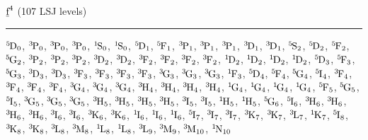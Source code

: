 \begin{mdframed}
\begin{center}
$\forb^{4}$
(107 LSJ levels)
\vspace{0.25cm}
\hrule
\vspace{0.25cm}

$\LSJterm{5}{D}{0}$, $\LSJterm{3}{P}{0}$, $\LSJterm{3}{P}{0}$, $\LSJterm{3}{P}{0}$, $\LSJterm{1}{S}{0}$, $\LSJterm{1}{S}{0}$, $\LSJterm{5}{D}{1}$, $\LSJterm{5}{F}{1}$, $\LSJterm{3}{P}{1}$, $\LSJterm{3}{P}{1}$, $\LSJterm{3}{P}{1}$, $\LSJterm{3}{D}{1}$, $\LSJterm{3}{D}{1}$, $\LSJterm{5}{S}{2}$, $\LSJterm{5}{D}{2}$, $\LSJterm{5}{F}{2}$, $\LSJterm{5}{G}{2}$, $\LSJterm{3}{P}{2}$, $\LSJterm{3}{P}{2}$, $\LSJterm{3}{P}{2}$, $\LSJterm{3}{D}{2}$, $\LSJterm{3}{D}{2}$, $\LSJterm{3}{F}{2}$, $\LSJterm{3}{F}{2}$, $\LSJterm{3}{F}{2}$, $\LSJterm{3}{F}{2}$, $\LSJterm{1}{D}{2}$, $\LSJterm{1}{D}{2}$, $\LSJterm{1}{D}{2}$, $\LSJterm{1}{D}{2}$, $\LSJterm{5}{D}{3}$, $\LSJterm{5}{F}{3}$, $\LSJterm{5}{G}{3}$, $\LSJterm{3}{D}{3}$, $\LSJterm{3}{D}{3}$, $\LSJterm{3}{F}{3}$, $\LSJterm{3}{F}{3}$, $\LSJterm{3}{F}{3}$, $\LSJterm{3}{F}{3}$, $\LSJterm{3}{G}{3}$, $\LSJterm{3}{G}{3}$, $\LSJterm{3}{G}{3}$, $\LSJterm{1}{F}{3}$, $\LSJterm{5}{D}{4}$, $\LSJterm{5}{F}{4}$, $\LSJterm{5}{G}{4}$, $\LSJterm{5}{I}{4}$, $\LSJterm{3}{F}{4}$, $\LSJterm{3}{F}{4}$, $\LSJterm{3}{F}{4}$, $\LSJterm{3}{F}{4}$, $\LSJterm{3}{G}{4}$, $\LSJterm{3}{G}{4}$, $\LSJterm{3}{G}{4}$, $\LSJterm{3}{H}{4}$, $\LSJterm{3}{H}{4}$, $\LSJterm{3}{H}{4}$, $\LSJterm{3}{H}{4}$, $\LSJterm{1}{G}{4}$, $\LSJterm{1}{G}{4}$, $\LSJterm{1}{G}{4}$, $\LSJterm{1}{G}{4}$, $\LSJterm{5}{F}{5}$, $\LSJterm{5}{G}{5}$, $\LSJterm{5}{I}{5}$, $\LSJterm{3}{G}{5}$, $\LSJterm{3}{G}{5}$, $\LSJterm{3}{G}{5}$, $\LSJterm{3}{H}{5}$, $\LSJterm{3}{H}{5}$, $\LSJterm{3}{H}{5}$, $\LSJterm{3}{H}{5}$, $\LSJterm{3}{I}{5}$, $\LSJterm{3}{I}{5}$, $\LSJterm{1}{H}{5}$, $\LSJterm{1}{H}{5}$, $\LSJterm{5}{G}{6}$, $\LSJterm{5}{I}{6}$, $\LSJterm{3}{H}{6}$, $\LSJterm{3}{H}{6}$, $\LSJterm{3}{H}{6}$, $\LSJterm{3}{H}{6}$, $\LSJterm{3}{I}{6}$, $\LSJterm{3}{I}{6}$, $\LSJterm{3}{K}{6}$, $\LSJterm{3}{K}{6}$, $\LSJterm{1}{I}{6}$, $\LSJterm{1}{I}{6}$, $\LSJterm{1}{I}{6}$, $\LSJterm{5}{I}{7}$, $\LSJterm{3}{I}{7}$, $\LSJterm{3}{I}{7}$, $\LSJterm{3}{K}{7}$, $\LSJterm{3}{K}{7}$, $\LSJterm{3}{L}{7}$, $\LSJterm{1}{K}{7}$, $\LSJterm{5}{I}{8}$, $\LSJterm{3}{K}{8}$, $\LSJterm{3}{K}{8}$, $\LSJterm{3}{L}{8}$, $\LSJterm{3}{M}{8}$, $\LSJterm{1}{L}{8}$, $\LSJterm{1}{L}{8}$, $\LSJterm{3}{L}{9}$, $\LSJterm{3}{M}{9}$, $\LSJterm{3}{M}{10}$, $\LSJterm{1}{N}{10}$
\end{center}
\end{mdframed}


